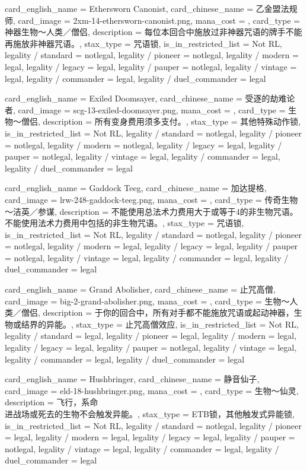 \documentclass[lang = cn, color = black, 10pt]{AllThatStax}
\begin{document}
\card
{
	card_english_name = {Ethersworn Canonist},
	card_chinese_name = {乙金盟法规师},
	card_image = 2xm-14-ethersworn-canonist.png,
	mana_cost = ,
	card_type = 神器生物～人类／僧侣,
	description = {每位本回合中施放过非神器咒语的牌手不能再施放非神器咒语。},
	stax_type = 咒语锁,
	is_in_restricted_list = Not RL,
	legality / standard = notlegal,
	legality / pioneer = notlegal,
	legality / modern = legal,
	legality / legacy = legal,
	legality / pauper = notlegal,
	legality / vintage = legal,
	legality / commander = legal,
	legality / duel_commander = legal
}

\card
{
	card_english_name = {Exiled Doomsayer},
	card_chinese_name = {受逐的劫难论者},
	card_image = scg-13-exiled-doomsayer.png,
	mana_cost = ,
	card_type = 生物～僧侣,
	description = {所有变身费用须多支付。},
	stax_type = 其他特殊动作锁,
	is_in_restricted_list = Not RL,
	legality / standard = notlegal,
	legality / pioneer = notlegal,
	legality / modern = notlegal,
	legality / legacy = legal,
	legality / pauper = notlegal,
	legality / vintage = legal,
	legality / commander = legal,
	legality / duel_commander = legal
}

\card
{
	card_english_name = {Gaddock Teeg},
	card_chinese_name = {加达提格},
	card_image = lrw-248-gaddock-teeg.png,
	mana_cost = ,
	card_type = 传奇生物～洁英／参谋,
	description = {不能使用总法术力费用大于或等于4的非生物咒语。\\
不能使用法术力费用中包括的非生物咒语。},
	stax_type = 咒语锁,
	is_in_restricted_list = Not RL,
	legality / standard = notlegal,
	legality / pioneer = notlegal,
	legality / modern = legal,
	legality / legacy = legal,
	legality / pauper = notlegal,
	legality / vintage = legal,
	legality / commander = legal,
	legality / duel_commander = legal
}

\card
{
	card_english_name = {Grand Abolisher},
	card_chinese_name = {止咒高僧},
	card_image = big-2-grand-abolisher.png,
	mana_cost = ,
	card_type = 生物～人类／僧侣,
	description = {于你的回合中，所有对手都不能施放咒语或起动神器，生物或结界的异能。},
	stax_type = 止咒高僧效应,
	is_in_restricted_list = Not RL,
	legality / standard = legal,
	legality / pioneer = legal,
	legality / modern = legal,
	legality / legacy = legal,
	legality / pauper = notlegal,
	legality / vintage = legal,
	legality / commander = legal,
	legality / duel_commander = legal
}

\card
{
	card_english_name = {Hushbringer},
	card_chinese_name = {静音仙子},
	card_image = eld-18-hushbringer.png,
	mana_cost = ,
	card_type = 生物～仙灵,
	description = {飞行，系命\\
进战场或死去的生物不会触发异能。},
	stax_type = ETB锁，其他触发式异能锁,
	is_in_restricted_list = Not RL,
	legality / standard = notlegal,
	legality / pioneer = legal,
	legality / modern = legal,
	legality / legacy = legal,
	legality / pauper = notlegal,
	legality / vintage = legal,
	legality / commander = legal,
	legality / duel_commander = legal
}
\end{document}
